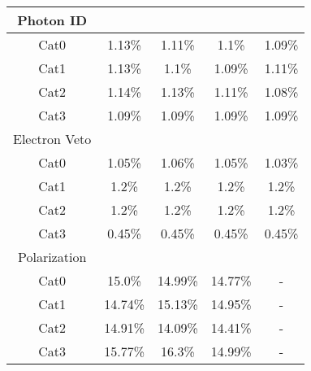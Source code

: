 \begin{tabular}{c|c|c|c|c}
\hline\hline
Photon ID  & \multicolumn{4}{l}{} \\ \hline
Cat0 & 1.13\% & 1.11\% & 1.1\% & 1.09\% \\
Cat1 & 1.13\% & 1.1\% & 1.09\% & 1.11\% \\
Cat2 & 1.14\% & 1.13\% & 1.11\% & 1.08\% \\
Cat3 & 1.09\% & 1.09\% & 1.09\% & 1.09\% \\
\hline\hline
Electron Veto  & \multicolumn{4}{l}{} \\ \hline
Cat0 & 1.05\% & 1.06\% & 1.05\% & 1.03\% \\
Cat1 & 1.2\% & 1.2\% & 1.2\% & 1.2\% \\
Cat2 & 1.2\% & 1.2\% & 1.2\% & 1.2\% \\
Cat3 & 0.45\% & 0.45\% & 0.45\% & 0.45\% \\
\hline\hline
Polarization  & \multicolumn{4}{l}{} \\ \hline
Cat0 & 15.0\% & 14.99\% & 14.77\% & - \\
Cat1 & 14.74\% & 15.13\% & 14.95\% & - \\
Cat2 & 14.91\% & 14.09\% & 14.41\% & - \\
Cat3 & 15.77\% & 16.3\% & 14.99\% & - \\
\hline\hline

\end{tabular}


